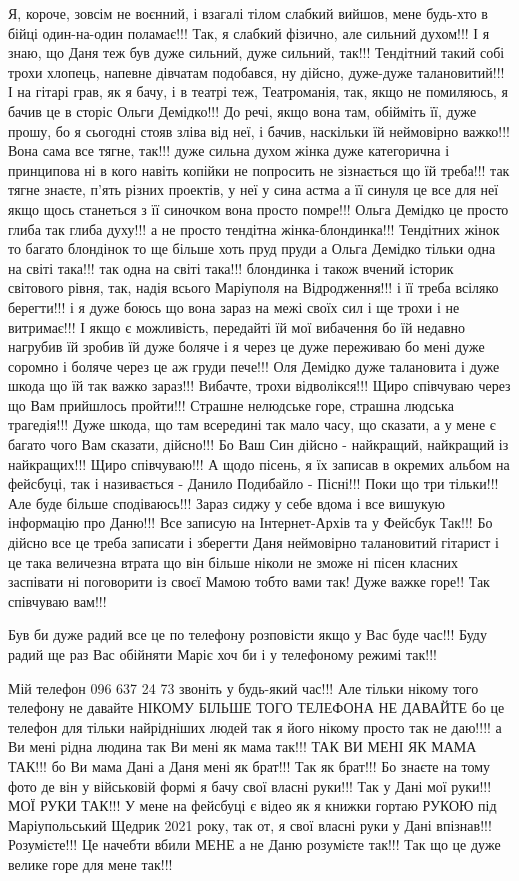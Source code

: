 Я, короче, зовсім не воєнний, і взагалі тілом слабкий вийшов, мене будь-хто в
бійці один-на-один поламає!!! Так, я слабкий фізично, але сильний духом!!! І я
знаю, що Даня теж був дуже сильний, дуже сильний, так!!! Тендітний такий собі
трохи хлопець, напевне дівчатам подобався, ну дійсно, дуже-дуже талановитий!!!
І на гітарі грав, як я бачу, і в театрі теж, Театроманія, так, якщо не
помиляюсь, я бачив це в сторіс Ольги Демідко!!! До речі, якщо вона там,
обійміть її, дуже прошу, бо я сьогодні стояв зліва від неї, і бачив, наскільки
їй неймовірно важко!!! Вона сама все тягне, так!!! дуже сильна духом жінка дуже
категорична і принципова ні в кого навіть копійки не попросить не зізнається що
їй треба!!! так тягне знаєте, п'ять різних проектів, у неї у сина астма а її
синуля це все для неї якщо щось станеться з її синочком вона просто помре!!!
Ольга Демідко це просто глиба так глиба духу!!! а не просто тендітна
жінка-блондинка!!!  Тендітних жінок то багато блондінок то ще більше хоть пруд
пруди а Ольга Демідко тільки одна на світі така!!! так одна на світі така!!!
блондинка і також вчений історик світового рівня, так, надія всього Маріуполя
на Відродження!!! і її треба всіляко берегти!!! і я дуже боюсь що вона зараз на
межі своїх сил і ще трохи і не витримає!!!  І якщо є можливість, передайті їй
мої вибачення бо їй недавно нагрубив їй зробив їй дуже боляче і я через це дуже
переживаю бо мені дуже соромно і боляче через це аж груди пече!!! Оля Демідко
дуже талановита і дуже шкода що їй так важко зараз!!! Вибачте, трохи
відволікся!!! Щиро співчуваю через що Вам прийшлось пройти!!!  Страшне
нелюдське горе, страшна людська трагедія!!! Дуже шкода, що там всередині так
мало часу, що сказати, а у мене є багато чого Вам сказати, дійсно!!! Бо Ваш Син
дійсно - найкращий, найкращий із найкращих!!!  Щиро співчуваю!!! А щодо пісень,
я їх записав в окремих альбом на фейсбуці, так і називається - Данило Подибайло
- Пісні!!!  Поки що три тільки!!! Але буде більше сподіваюсь!!!  Зараз сиджу у
себе вдома і все вишукую інформацію про Даню!!! Все записую на Інтернет-Архів
та у Фейсбук Так!!! Бо дійсно все це треба записати і зберегти Даня неймовірно
талановитий гітарист і це така величезна втрата що він більше ніколи не зможе
ні пісен класних заспівати ні поговорити із своєї Мамою тобто вами так! Дуже
важке горе!! Так співчуваю вам!!!

Був би дуже радий все це по телефону розповісти якщо у Вас буде час!!! Буду
радий ще раз Вас обійняти Маріє хоч би і у телефоному режимі так!!!

Мій телефон 096 637 24 73 звоніть у будь-який час!!! Але тільки нікому того
телефону не давайте НІКОМУ БІЛЬШЕ ТОГО ТЕЛЕФОНА НЕ ДАВАЙТЕ бо це телефон для
тільки найрідніших людей так я його нікому просто так не даю!!!!  а Ви мені
рідна людина так Ви мені як мама так!!! ТАК ВИ МЕНІ ЯК МАМА ТАК!!! бо Ви мама
Дані а Даня мені як брат!!! Так як брат!!! Бо знаєте на тому фото де він у
військовій формі я бачу свої власні руки!!! Так у Дані мої руки!!! МОЇ РУКИ
ТАК!!! У мене на фейсбуці є відео як я книжки гортаю РУКОЮ під Маріупольський
Щедрик 2021 року, так от, я свої власні руки у Дані впізнав!!! Розумієте!!!  Це
начебти вбили МЕНЕ а не Даню розумієте так!!! Так що це дуже велике горе для
мене так!!!

